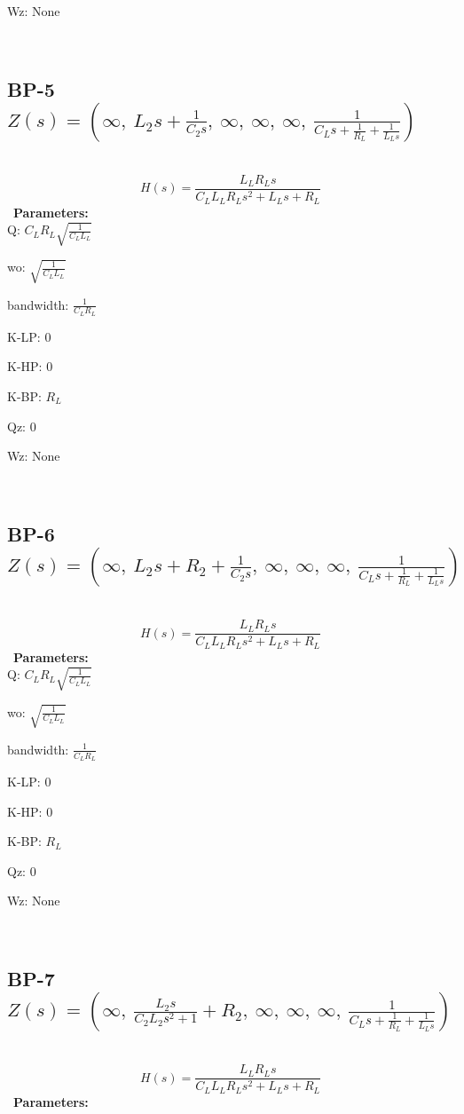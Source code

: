 \documentclass{article}
\begin{document}
Wz: $\text{None}$\ 

\ 

\subsection{BP-5 $Z(s) = \left( \infty, \  L_{2} s + \frac{1}{C_{2} s}, \  \infty, \  \infty, \  \infty, \  \frac{1}{C_{L} s + \frac{1}{R_{L}} + \frac{1}{L_{L} s}}\right)$ } \ 
\textbf{\[H(s) = \frac{L_{L} R_{L} s}{C_{L} L_{L} R_{L} s^{2} + L_{L} s + R_{L}}\] } \ 
\textbf{Parameters:}\\ 

Q: $C_{L} R_{L} \sqrt{\frac{1}{C_{L} L_{L}}}$\ 

wo: $\sqrt{\frac{1}{C_{L} L_{L}}}$\ 

bandwidth: $\frac{1}{C_{L} R_{L}}$\ 

K-LP: $0$\ 

K-HP: $0$\ 

K-BP: $R_{L}$\ 

Qz: $0$\ 

Wz: $\text{None}$\ 

\ 

\subsection{BP-6 $Z(s) = \left( \infty, \  L_{2} s + R_{2} + \frac{1}{C_{2} s}, \  \infty, \  \infty, \  \infty, \  \frac{1}{C_{L} s + \frac{1}{R_{L}} + \frac{1}{L_{L} s}}\right)$ } \ 
\textbf{\[H(s) = \frac{L_{L} R_{L} s}{C_{L} L_{L} R_{L} s^{2} + L_{L} s + R_{L}}\] } \ 
\textbf{Parameters:}\\ 

Q: $C_{L} R_{L} \sqrt{\frac{1}{C_{L} L_{L}}}$\ 

wo: $\sqrt{\frac{1}{C_{L} L_{L}}}$\ 

bandwidth: $\frac{1}{C_{L} R_{L}}$\ 

K-LP: $0$\ 

K-HP: $0$\ 

K-BP: $R_{L}$\ 

Qz: $0$\ 

Wz: $\text{None}$\ 

\ 

\subsection{BP-7 $Z(s) = \left( \infty, \  \frac{L_{2} s}{C_{2} L_{2} s^{2} + 1} + R_{2}, \  \infty, \  \infty, \  \infty, \  \frac{1}{C_{L} s + \frac{1}{R_{L}} + \frac{1}{L_{L} s}}\right)$ } \ 
\textbf{\[H(s) = \frac{L_{L} R_{L} s}{C_{L} L_{L} R_{L} s^{2} + L_{L} s + R_{L}}\] } \ 
\textbf{Parameters:}\\ 
\end{document}
